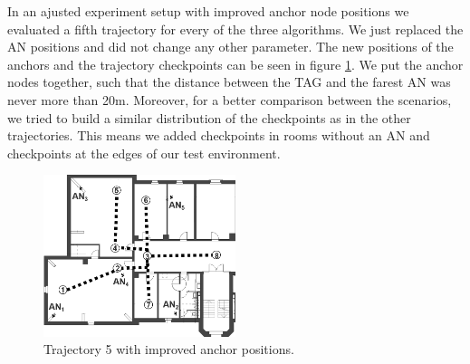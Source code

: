 In an ajusted experiment setup with improved anchor node positions we evaluated a fifth trajectory for every of the three algorithms. We just replaced the AN positions and did not change any other parameter. The new positions of the anchors and the trajectory checkpoints can be seen in figure \ref{fig:trajectory5_withAnchors}. We put the anchor nodes together, such that the distance between the TAG and the farest AN was never more than 20m. Moreover, for a better comparison between the scenarios,  we tried to build a similar distribution of the checkpoints as in the other trajectories. This means we added checkpoints in rooms without an AN and checkpoints at the edges of our test environment. 

\begin{figure}[th]
\centering
\includegraphics[width=0.5\textwidth]{Figures/trajectory5_withAnchors}
\decoRule
\caption[Trajectory 5]{Trajectory 5 with improved anchor positions.}
\label{fig:trajectory5_withAnchors}
\end{figure}
